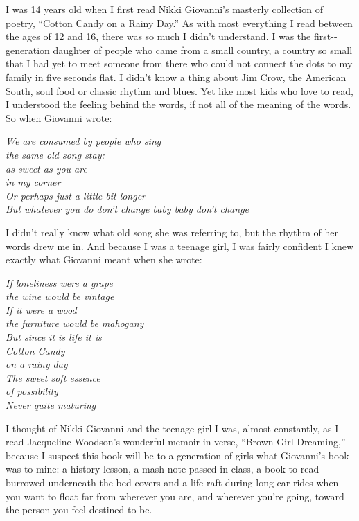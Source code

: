 I was 14 years old when I first read Nikki Giovanni's masterly
collection of poetry, ``Cotton Candy on a Rainy Day.'' As with most
everything I read between the ages of 12 and 16, there was so much I
didn't understand. I was the first-­generation daughter of people who
came from a small country, a country so small that I had yet to meet
someone from there who could not connect the dots to my family in five
seconds flat. I didn't know a thing about Jim Crow, the American South,
soul food or classic rhythm and blues. Yet like most kids who love to
read, I understood the feeling behind the words, if not all of the
meaning of the words. So when Giovanni wrote:

\emph{We are consumed by people who sing}\\
\emph{the same old song stay:}\\
\emph{as sweet as you are}\\
\emph{in my corner}\\
\emph{Or perhaps just a little bit longer}\\
\emph{But whatever you do don't change baby baby don't change}

I didn't really know what old song she was referring to, but the rhythm
of her words drew me in. And because I was a teenage girl, I was fairly
confident I knew exactly what Giovanni meant when she wrote:

\emph{If loneliness were a grape}\\
\emph{the wine would be vintage}\\
\emph{If it were a wood}\\
\emph{the furniture would be mahogany}\\
\emph{But since it is life it is}\\
\emph{Cotton Candy}\\
\emph{on a rainy day}\\
\emph{The sweet soft essence}\\
\emph{of possibility}\\
\emph{Never quite maturing}

I thought of Nikki Giovanni and the teenage girl I was, almost
constantly, as I read Jacqueline Woodson's wonderful memoir in verse,
``Brown Girl Dreaming,'' because I suspect this book will be to a
generation of girls what Giovanni's book was to mine: a history lesson,
a mash note passed in class, a book to read burrowed underneath the bed
covers and a life raft during long car rides when you want to float far
from wherever you are, and wherever you're going, toward the person you
feel destined to be.

